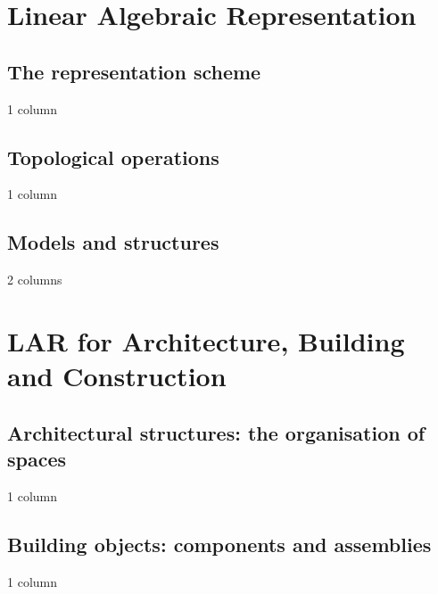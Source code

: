 \documentclass[11pt,oneside]{article}	%
\begin{document}
\section{Linear Algebraic Representation}
\subsection{The representation scheme}
1 column
\subsection{Topological operations}
1 column
\subsection{Models and structures}
2 columns
\section{LAR for Architecture, Building and Construction}
\subsection{Architectural structures: the organisation of spaces}
1 column
\subsection{Building objects: components and assemblies}
1 column
\end{document}
